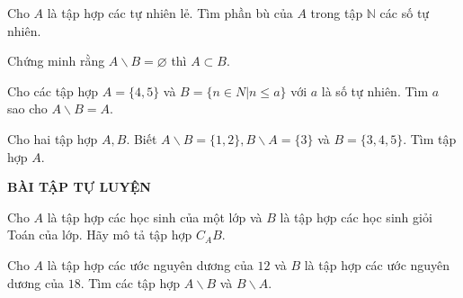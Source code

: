 \begin{vd}%
	Cho $A$ là tập hợp các tự nhiên lẻ. Tìm phần bù của $A$ trong tập $\mathbb{N}$ các số tự nhiên.
\end{vd}

\begin{vd}%
	Chứng minh rằng $A \backslash B = \varnothing$ thì $A \subset B$.
\end{vd}

\begin{vd}%
	Cho các tập hợp $A=\{4,5\}$ và $B= \{n \in N | n \le a\}$ với $a$ là số tự nhiên. Tìm $a$ sao cho $A \backslash B =A$.
\end{vd}

\begin{vd}%
	Cho hai tập hợp $A, B$. Biết $A \backslash B = \{1, 2\}, B \backslash A = \{3\}$ và $B= \{3,4,5\}$. Tìm tập hợp $A$.
\end{vd}
\begin{center}
\textbf{BÀI TẬP TỰ LUYỆN}
\end{center}
\begin{bt}%
	Cho $A$ là tập hợp các học sinh của một lớp và $B$ là tập hợp các học sinh giỏi Toán của lớp. Hãy mô tả tập hợp $C_A B$.
\end{bt}

\begin{bt}%
	Cho $A$ là tập hợp các ước nguyên dương của $12$ và $B$ là tập hợp các ước nguyên dương của $18$. Tìm các tập hợp $A \backslash B$ và $B \backslash A$.
\end{bt}

